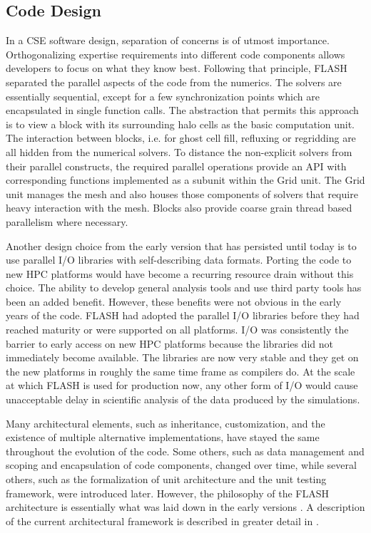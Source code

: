 \subsection{Code Design}
In a CSE software design, separation of concerns is of utmost
importance. Orthogonalizing expertise requirements into different code
components allows developers to focus on what they know best.  
Following that principle, FLASH separated the parallel aspects of the
code from the numerics. The solvers are essentially sequential, except
for a few synchronization points which are encapsulated in single
function calls. The abstraction that permits this approach is to view
a block with its surrounding halo cells as the basic computation
unit. The interaction between blocks, i.e. for ghost cell fill, refluxing
or regridding are all hidden from the numerical solvers. 
To distance the non-explicit solvers from their parallel constructs,
the required parallel operations provide an API with corresponding
functions implemented as a subunit within the Grid  unit. The Grid
unit manages the mesh and also houses those 
components of solvers that require heavy interaction with the
mesh. Blocks also provide coarse grain thread based parallelism where
necessary. 

Another design choice from the early version that has persisted 
until today is to use parallel I/O libraries with self-describing data
formats. Porting the code to new HPC platforms would have become
a recurring resource drain without this choice. The ability to develop
general analysis tools and use third party tools has been an added
benefit. However, these benefits were not obvious in the early years
of the code. FLASH had adopted the parallel I/O libraries before they
had reached maturity or were supported on all platforms. I/O was
consistently the barrier to early access on new HPC platforms because 
the libraries did not immediately become available. The libraries are
now very stable and they get on the new platforms in roughly the same
time frame as compilers do.  At the scale at which FLASH is used for
production now, any other form of I/O would cause unacceptable delay
in scientific analysis of the data produced by the simulations.  

Many architectural elements, such as inheritance, customization, and
the existence of multiple alternative implementations, have stayed the same
throughout the evolution of the code. Some others, such as data
management and scoping and encapsulation of code components, changed
over time, while several others, such as the formalization of unit
architecture and the unit testing framework, were introduced
later. However, the philosophy of the FLASH architecture is
essentially what was laid down in the early versions
\citep{Fryxell2000}.  A description of the current architectural 
framework is described in greater detail in \citet{Dubey2009}. 

